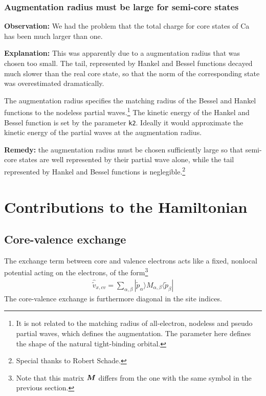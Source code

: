 \documentclass[11pt,a4paper]{report}
\begin{document}
\subsection{Augmentation radius must be large for semi-core states}
\textbf{Observation:} We had the problem that the total charge for
core states of Ca has been much larger than one.


\textbf{Explanation:} This was apparently due to a augmentation radius
that was chosen too small. The tail, represented by Hankel and Bessel
functions decayed much slower than the real core state, so that the
norm of the corresponding state was overestimated dramatically.

The augmentation radius specifies the matching radius of the Bessel
and Hankel functions to the nodeless partial waves.\footnote{It is not
  related to the matching radius of all-electron, nodeless and pseudo
  partial waves, which defines the augmentation. The parameter here
  defines the shape of the natural tight-binding orbital.} The kinetic
energy of the Hankel and Bessel function is set by the parameter
\verb|k2|. Ideally it would approximate the kinetic energy of the
partial waves at the augmentation radius.

\textbf{Remedy:} the augmentation radius must be chosen sufficiently
large so that semi-core states are well represented by their partial
wave alone, while the tail represented by Hankel and Bessel functions
is neglegible.\footnote{Special thanks to Robert Schade.}


\chapter{Contributions to the Hamiltonian}
\section{Core-valence exchange}
The exchange term between core and valence electrons acts like a
fixed, nonlocal potential acting on the electrons, of the
form\footnote{Note that this matrix $\bm{M}$ differs from the one
  with the same symbol in the previous section.}
\begin{eqnarray}
\hat{\tilde{v}}_{x,cv}=\sum_{\alpha,\beta}|\tilde{p}_\alpha\rangle 
M_{\alpha,\beta}\langle\tilde{p}_\beta|
\end{eqnarray}
The core-valence exchange is furthermore diagonal in the site indices.
\end{document}
